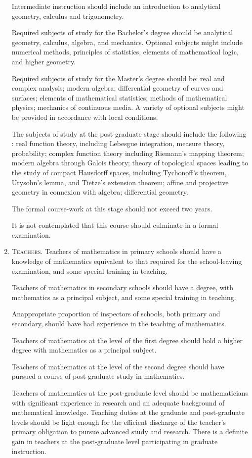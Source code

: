 \begin{enumerate}
Intermediate instruction should include an introduction to analytical geometry, calculus and trigonometry.

Required subjects of study for the Bachelor's degree should be analytical geometry, calculus, algebra, and mechanics. Optional subjects might include numerical methods, principles of statistics, elements of mathematical logic, and higher geometry.

Required subjects of study for the Master's degree should be: real and complex analysis; modern algebra; differential geometry of curves and surfaces; elements of mathematical statistics; methods of mathematical physics; mechanics of continuous media. A variety of optional subjects might be provided in accordance with local conditions.

The subjects of study at the post-graduate stage should include the following : real function theory, including Lebesgue integration, measure theory, probability; complex function theory including Riemann's mapping theorem; modern algebra through Galois theory; theory of topological spaces leading to the study of compact Hausdorff spaces, including Tychonoff's theorem, Urysohn's lemma, and Tietze's extension theorem; affine and projective geometry in connexion with algebra; differential geometry.

The formal course-work at this stage should not exceed two years.

It is not contemplated that this course should culminate in a formal examination.

\item \textsc{Teachers.} Teachers of mathematics in primary schools should have a knowledge of mathematics equivalent to that required for the school-leaving examination, and some special training in teaching. 

Teachers of mathematics in secondary schools should have a degree, with mathematics as a principal subject, and some special training in teaching.

An\pageoriginale appropriate proportion of inspectors of schools, both primary and secondary, should have had experience in the teaching of mathematics.

Teachers of mathematics at the level of the first degree should hold a higher degree with mathematics as a principal subject.

Teachers of mathematics at the level of the second degree should have pursued a course of post-graduate study in mathematics.

Teachers of mathematics at the post-graduate level should be mathematicians with significant experience in research and an adequate background of mathematical knowledge. Teaching duties at the graduate and post-graduate levels should be light enough for the efficient discharge of the teacher's primary obligation to pursue advanced study and research. There is a definite gain in teachers at the post-graduate level participating in graduate instruction.


\end{enumerate}
